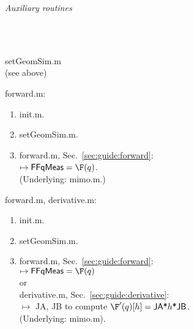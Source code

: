 \begin{minipage}[t]{\dimexpr.24\textwidth-\tabcolsep-.5pt}
\centerline{\emph{Auxiliary routines}}
\vspace*{-0.2cm}

\hrulefill

\ \\ \\
\vspace*{-0.2cm}

\hrulefill

\bigskip
\bigskip
\bigskip

\textsf{setGeomSim.m}\\
(see above)

\bigskip

\textsf{forward.m}:

\begin{enumerate}[topsep=0mm, itemsep=0mm, parsep=0mm, leftmargin=3mm, labelsep=0.5mm]
 \item \textsf{init.m}.
 \item \textsf{setGeomSim.m}.
 \item \textsf{forward.m}, Sec.~\ref{sec:guide:forward}: \\ $\mapsto \textsf{FFqMeas} = \F(q)$.\\
 (Underlying: \textsf{mimo.m}.)
\end{enumerate}

\vspace{2.0cm}
\vspace*{-0.2cm}

\hrulefill

\bigskip

\textsf{forward.m}, \textsf{derivative.m}:

\begin{enumerate}[topsep=0mm, itemsep=0mm, parsep=0mm, leftmargin=3mm, labelsep=0.5mm]
 \item \textsf{init.m}.
 \item \textsf{setGeomSim.m}.
 \item \textsf{forward.m}, Sec.~\ref{sec:guide:forward}: \\ $\mapsto \textsf{FFqMeas} = \F(q)$\\ 
 or\\
 \textsf{derivative.m}, Sec.~\ref{sec:guide:derivative}: \\ $\mapsto$ \textsf{JA}, \textsf{JB} to compute $\F'(q)[h] = \textsf{JA*}h\textsf{*JB}$.\\
 (Underlying: \textsf{mimo.m}).
\end{enumerate}

\end{minipage}
